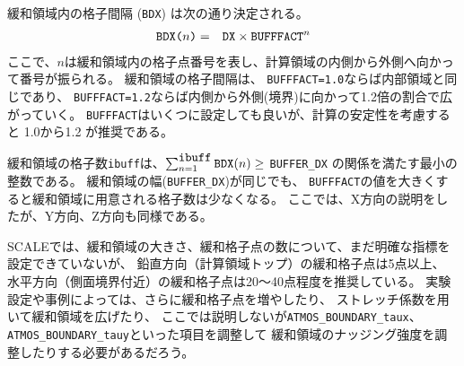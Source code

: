 緩和領域内の格子間隔 (\verb|BDX|) は次の通り決定される。
\begin{eqnarray}
 \verb|BDX(|n\verb|)| &=& \verb|DX| \times \verb|BUFFFACT|^n \nonumber
\end{eqnarray}
ここで、$n$は緩和領域内の格子点番号を表し、計算領域の内側から外側へ向かって番号が振られる。
緩和領域の格子間隔は、
\verb|BUFFFACT=1.0|ならば内部領域と同じであり、
\verb|BUFFFACT=1.2|ならば内側から外側(境界)に向かって1.2倍の割合で広がっていく。
\verb|BUFFFACT|はいくつに設定しても良いが、計算の安定性を考慮すると 1.0から1.2 が推奨である。

緩和領域の格子数\verb|ibuff|は、$\sum_{n=1}^{\verb|ibuff|} \verb|BDX|(n) \ge$ \verb|BUFFER_DX| の関係を満たす最小の整数である。
%
緩和領域の幅(\verb|BUFFER_DX|)が同じでも、
\verb|BUFFFACT|の値を大きくすると緩和領域に用意される格子数は少なくなる。
ここでは、X方向の説明をしたが、Y方向、Z方向も同様である。


SCALEでは、緩和領域の大きさ、緩和格子点の数について、まだ明確な指標を設定できていないが、
鉛直方向（計算領域トップ）の緩和格子点は5点以上、
水平方向（側面境界付近）の緩和格子点は20〜40点程度を推奨している。
実験設定や事例によっては、さらに緩和格子点を増やしたり、
ストレッチ係数を用いて緩和領域を広げたり、
ここでは説明しないが\verb|ATMOS_BOUNDARY_taux|、\verb|ATMOS_BOUNDARY_tauy|といった項目を調整して
緩和領域のナッジング強度を調整したりする必要があるだろう。

